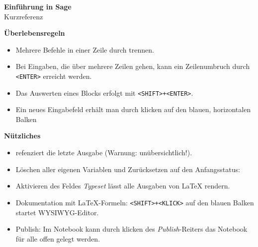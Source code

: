 \documentclass[a4paper,9pt,DIV15,twocolumn]{scrartcl}
\begin{document}
\begin{center}
        \textbf{\LARGE Einf\"uhrung in Sage}\\
        {\large Kurzreferenz}
\end{center}


\textbf{Überlebensregeln}
\begin{itemize}
\item Mehrere Befehle in einer Zeile durch \isage{;} trennen.
\item Bei Eingaben, die über mehrere Zeilen gehen, kann ein
  Zeilenumbruch durch {\color{blue} \verb~<ENTER>~} erreicht werden.
\item Das Auswerten eines Blocks erfolgt mit {\color{blue} \verb~<SHIFT>+<ENTER>~}.
\item Ein neues Eingabefeld erhält man durch klicken auf den blauen, horizontalen Balken
\end{itemize}
\textbf{Nützliches}
\begin{itemize}
\item {\color{blue} \isage{_} } refenziert die letzte Ausgabe (Warnung: unübersichtlich!).
\item Löschen aller eigenen Variablen und Zurücksetzen auf den Anfangsstatus: {\color{blue} }
\item Aktivieren des Feldes \emph{Typeset} lässt alle Ausgaben von \LaTeX{} rendern.
\item Dokumentation mit \LaTeX{}-Formeln:{\color{blue} \verb~<SHIFT>+<KLICK>~ }auf den blauen Balken startet WYSIWYG-Editor.
\item Publish: Im Notebook kann durch klicken des \emph{Publish}-Reiters das Notebook für alle offen gelegt werden. 
\end{itemize}
\end{document}
